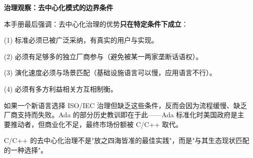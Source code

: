 \documentclass[12pt,a4paper,fontset=fandol]{ctexbook}
\begin{document}
\begin{govbox}
\textbf{治理观察：去中心化模式的边界条件}

本手册最后强调：去中心化治理的优势\textbf{只在特定条件下成立}：

(1) 标准必须已被广泛采纳，有真实的用户与实现。

(2) 必须有足够多的独立厂商参与（避免被某一两家垄断话语权）。

(3) 演化速度必须与场景匹配（基础设施语言可以慢，应用语言不行）。

(4) 必须有多方利益相关方互相制衡。

如果一个新语言选择 ISO/IEC 治理但缺乏这些条件，反而会因为流程缓慢、缺乏厂商支持而失败。Ada 的部分历史教训即在于此——Ada 标准化时美国政府是主要推动者，但商业化不足，最终市场份额被 C/C++ 取代。

C/C++ 的去中心化治理不是"放之四海皆准的最佳实践"，而是"与其生态现状匹配的一种选择"。
\end{govbox}
\end{document}
